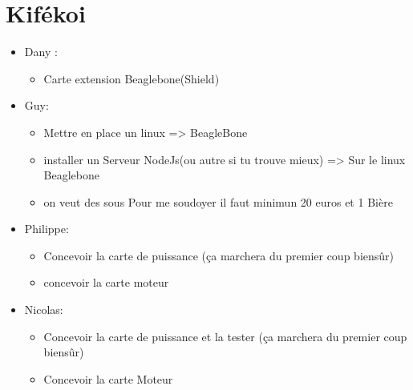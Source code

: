 \documentclass[10pt,a4paper]{article}
\begin{document}
\section{Kifékoi}
\begin{itemize}
\item Dany : 
    \begin{itemize}
   \item Carte extension Beaglebone(Shield)
   \end{itemize}
\item Guy:
   \begin{itemize}
   \item Mettre en place un linux => BeagleBone
   \item installer un Serveur NodeJs(ou autre si tu trouve mieux) => Sur le linux Beaglebone
   \item on veut des sous Pour me soudoyer il faut minimun 20 euros et 1 Bière
   \end{itemize}
\item Philippe:
    \begin{itemize}
    \item Concevoir la carte de puissance (ça marchera du premier coup biensûr)
    \item concevoir la carte moteur
    \end{itemize}
\item Nicolas:
    \begin{itemize}
    \item Concevoir la carte de puissance et la tester (ça marchera du premier coup biensûr)
    \item Concevoir la carte Moteur
    \end{itemize}
\end{itemize}
\end{document}
